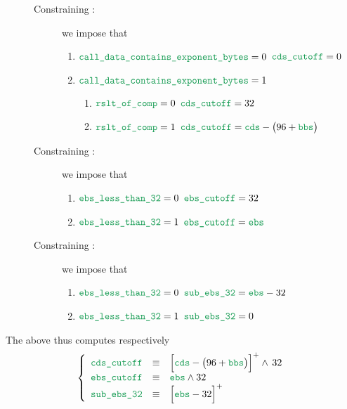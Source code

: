 \begin{description}
\begin{description}
\[				\]
			\item[Constraining \locCdsCutoff{}:] we impose that
				\begin{enumerate}
					\item \If $\locCallDataContainsExponentBytes = 0$ \Then $\locCdsCutoff = 0$
					\item \If $\locCallDataContainsExponentBytes = 1$ \Then
						\begin{enumerate}
							\item \If $\locResultOfComparison = 0$ \Then $\locCdsCutoff = 32$
							\item \If $\locResultOfComparison = 1$ \Then $\locCdsCutoff = \locCds - \big( 96 + \locBbs \big)$
						\end{enumerate}
				\end{enumerate}
			\item[Constraining \locEbsCutoff       {}:] we impose that
				\begin{enumerate}
					\item \If $\locEbsLtThirtyTwo = 0$ \Then $\locEbsCutoff = 32$ 
					\item \If $\locEbsLtThirtyTwo = 1$ \Then $\locEbsCutoff = \locEbs$ 
				\end{enumerate}
			\item[Constraining \locEbsSubThirtyTwo {}:] we impose that
				\begin{enumerate}
					\item \If $\locEbsLtThirtyTwo = 0$ \Then $\locEbsSubThirtyTwo = \locEbs - 32$ 
					\item \If $\locEbsLtThirtyTwo = 1$ \Then $\locEbsSubThirtyTwo = 0$ 
				\end{enumerate}
		\end{description}
\end{description}
\saNote{} The above thus computes respectively
\[
	\left\{ \begin{array}{lcl}
		\locCdsCutoff           & \equiv & \Big[ \locCds - \big( 96 + \locBbs \big) \Big] ^ + \wedge \, 32 \\
		\locEbsCutoff           & \equiv & \locEbs \wedge 32                                               \\
		\locEbsSubThirtyTwo     & \equiv & \Big[ \locEbs - 32 \Big] ^ +                                    \\
	\end{array} \right.
\]
